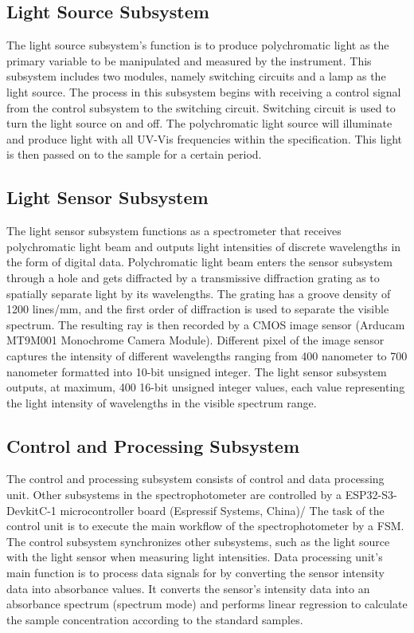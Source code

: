 \documentclass[conference]{IEEEtran}
\begin{document}
\subsection{Light Source Subsystem}
The light source subsystem's function is to produce polychromatic light as the primary variable to be manipulated and measured by the instrument.
This subsystem includes two modules, namely switching circuits and a lamp as the light source.
The process in this subsystem begins with receiving a control signal from the control subsystem to the switching circuit.
Switching circuit is used to turn the light source on and off.
The polychromatic light source will illuminate and produce light with all UV-Vis frequencies within the specification.
This light is then passed on to the sample for a certain period.

\subsection{Light Sensor Subsystem}
The light sensor subsystem functions as a spectrometer that receives polychromatic light beam and outputs light intensities of discrete wavelengths in the form of digital data.
Polychromatic light beam enters the sensor subsystem through a hole and gets diffracted by a transmissive diffraction grating as to spatially separate light by its wavelengths.
The grating has a groove density of 1200 lines/mm, and the first order of diffraction is used to separate the visible spectrum.
The resulting ray is then recorded by a CMOS image sensor (Arducam MT9M001 Monochrome Camera Module).
Different pixel of the image sensor captures the intensity of different wavelengths ranging from 400 nanometer to 700 nanometer formatted into 10-bit unsigned integer.
The light sensor subsystem outputs, at maximum, 400 16-bit unsigned integer values, each value representing the light intensity of wavelengths in the visible spectrum range. 

\subsection{Control and Processing Subsystem}
The control and processing subsystem consists of control and data processing unit.
Other subsystems in the spectrophotometer are controlled by a ESP32-S3-DevkitC-1 microcontroller board (Espressif Systems, China)/
The task of the control unit is to execute the main workflow of the spectrophotometer by a FSM.
The control subsystem synchronizes other subsystems, such as the light source with the light sensor when measuring light intensities.
Data processing unit's main function is to process data signals for by converting the sensor intensity data into absorbance values.
It converts the sensor's intensity data into an absorbance spectrum (spectrum mode) and performs linear regression to calculate the sample concentration according to the standard samples.
\end{document}
